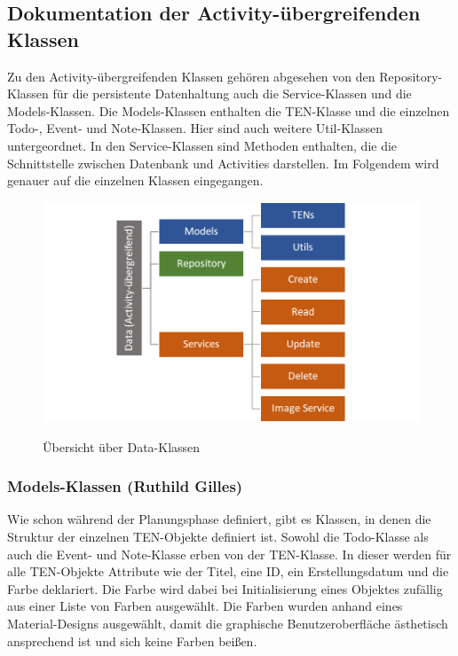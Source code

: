 \newpage
\subsection{Dokumentation der Activity-übergreifenden Klassen}

Zu den Activity-übergreifenden Klassen gehören abgesehen von den Repository-Klassen für die persistente Datenhaltung auch die Service-Klassen und die Models-Klassen. Die Models-Klassen enthalten die TEN-Klasse und die einzelnen Todo-, Event- und Note-Klassen. Hier sind auch weitere Util-Klassen untergeordnet. In den Service-Klassen sind Methoden enthalten, die die Schnittstelle zwischen Datenbank und Activities darstellen. Im Folgendem wird genauer auf die einzelnen Klassen eingegangen.

\begin{figure}[H]
\centering
\begin{minipage}[t]{1\textwidth} %
\caption{Übersicht über Data-Klassen} %
\includegraphics[width=1\textwidth]{img/StrukturDataKlassen}\\ %
\end{minipage}
\end{figure}

\subsubsection{Models-Klassen (Ruthild Gilles)}

Wie schon während der Planungsphase definiert, gibt es Klassen, in denen die Struktur der einzelnen TEN-Objekte definiert ist. Sowohl die Todo-Klasse als auch die Event- und Note-Klasse erben von der TEN-Klasse. In dieser werden für alle TEN-Objekte Attribute wie der Titel, eine ID, ein Erstellungsdatum und die Farbe deklariert. Die Farbe wird dabei bei Initialisierung eines Objektes zufällig aus einer Liste von Farben ausgewählt. Die Farben wurden anhand eines Material-Designs ausgewählt, damit die graphische Benutzeroberfläche ästhetisch ansprechend ist und sich keine Farben beißen.

